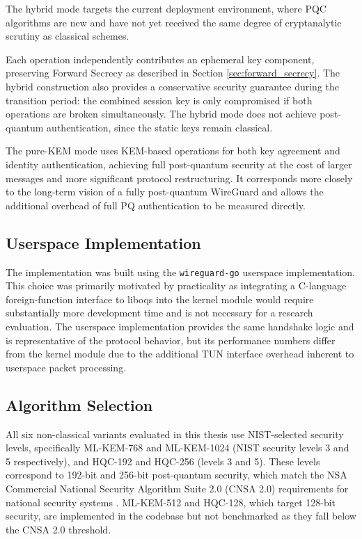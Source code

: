 The hybrid mode targets the current deployment environment, where PQC algorithms are new and have not yet received the same degree of cryptanalytic scrutiny as classical schemes. 

Each operation independently contributes an ephemeral key component, preserving Forward Secrecy as described in Section \ref{sec:forward_secrecy}. The hybrid construction also provides a conservative security guarantee during the transition period: the combined session key is only compromised if both operations are broken simultaneously. The hybrid mode does not achieve post-quantum authentication, since the static keys remain classical. 

The pure-KEM mode uses KEM-based operations for both key agreement and identity authentication, achieving full post-quantum security at the cost of larger messages and more significant protocol restructuring. It corresponds more closely to the long-term vision of a fully post-quantum WireGuard and allows the additional overhead of full PQ authentication to be measured directly.

\subsection{Userspace Implementation} 
The implementation was built using the \texttt{wireguard-go} userspace implementation. This choice was primarily motivated by practicality as integrating a C-language foreign-function interface to liboqs into the kernel module would require substantially more development time and is not necessary for a research evaluation. The userspace implementation provides the same handshake logic and is representative of the protocol behavior, but its performance numbers differ from the kernel module due to the additional TUN interface overhead inherent to userspace packet processing. 

\subsection{Algorithm Selection} 
All six non-classical variants evaluated in this thesis use NIST-selected security levels, specifically ML-KEM-768 and ML-KEM-1024 (NIST security levels 3 and 5 respectively), and HQC-192 and HQC-256 (levels 3 and 5). These levels correspond to 192-bit and 256-bit post-quantum security, which match the NSA Commercial National Security Algorithm Suite 2.0 (CNSA 2.0) requirements for national security systems \cite{NSA2022CNSA2}. ML-KEM-512 and HQC-128, which target 128-bit security, are implemented in the codebase but not benchmarked as they fall below the CNSA 2.0 threshold.

